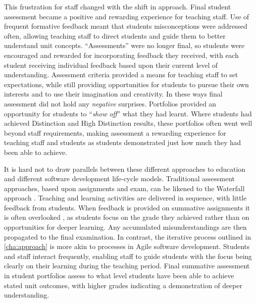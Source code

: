 This frustration for staff changed with the shift in approach. Final student assessment became a positive and rewarding experience for teaching staff. Use of frequent formative feedback meant that students misconceptions were addressed often, allowing teaching staff to direct students and guide them to better understand unit concepts. ``Assessments'' were no longer final, so students were encouraged and rewarded for incorporating feedback they received, with each student receiving individual feedback based upon their current level of understanding. Assessment criteria provided a means for teaching staff to set expectations, while still providing opportunities for students to pursue their own interests and to use their imagination and creativity. In these ways final assessment did not hold any \emph{negative} surprises. Portfolios provided an opportunity for students to ``\emph{show off}'' what they had learnt. Where students had achieved Distinction and High Distinction results, these portfolios often went well beyond staff requirements, making assessment a rewarding experience for teaching staff and students as students demonstrated just how much they had been able to achieve.

It is hard not to draw parallels between these different approaches to education and different software development life-cycle models. Traditional assessment approaches, based upon assignments and exam, can be likened to the Waterfall approach \cite{Royce:1970}. Teaching and learning activities are delivered in sequence, with little feedback from students. When feedback is provided on summative assignments it is often overlooked \cite{Black:1998}, as students focus on the grade they achieved rather than on opportunities for deeper learning. Any accumulated misunderstandings are then propagated to the final examination. In contrast, the iterative process outlined in \cref{cha:approach} is more akin to processes in Agile software development. Students and staff interact frequently, enabling staff to guide students with the focus being clearly on their learning during the teaching period. Final summative assessment in student portfolios assess to what level students have been able to achieve stated unit outcomes, with higher grades indicating a demonstration of deeper understanding.

